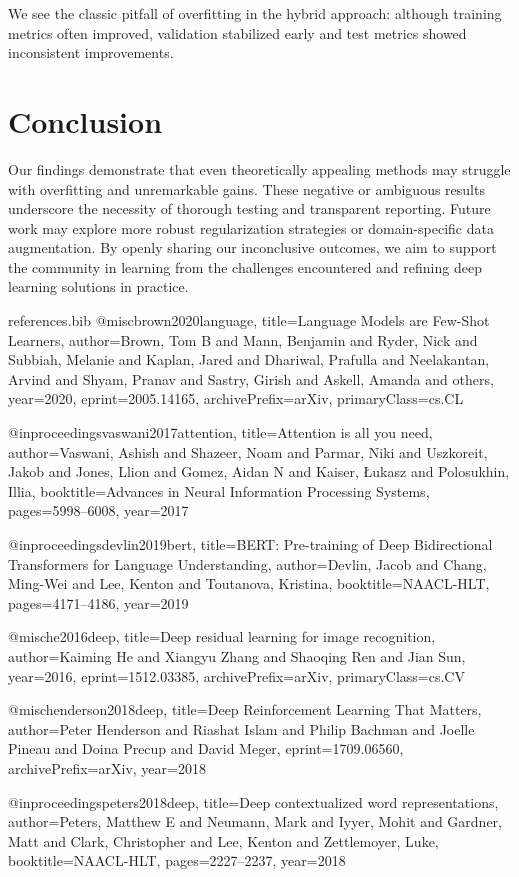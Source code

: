 \documentclass{article}
\begin{document}
We see the classic pitfall of overfitting in the hybrid approach: although training metrics often improved, validation stabilized early and test metrics showed inconsistent improvements.

\section{Conclusion}
Our findings demonstrate that even theoretically appealing methods may struggle with overfitting and unremarkable gains. These negative or ambiguous results underscore the necessity of thorough testing and transparent reporting. Future work may explore more robust regularization strategies or domain-specific data augmentation. By openly sharing our inconclusive outcomes, we aim to support the community in learning from the challenges encountered and refining deep learning solutions in practice.


\begin{filecontents}{references.bib}
@misc{brown2020language,
  title={Language Models are Few-Shot Learners},
  author={Brown, Tom B and Mann, Benjamin and Ryder, Nick and Subbiah, Melanie and Kaplan, Jared and Dhariwal, Prafulla and Neelakantan, Arvind and Shyam, Pranav and Sastry, Girish and Askell, Amanda and others},
  year={2020},
  eprint={2005.14165},
  archivePrefix={arXiv},
  primaryClass={cs.CL}
}

@inproceedings{vaswani2017attention,
  title={Attention is all you need},
  author={Vaswani, Ashish and Shazeer, Noam and Parmar, Niki and Uszkoreit, Jakob and Jones, Llion and Gomez, Aidan N and Kaiser, {\L}ukasz and Polosukhin, Illia},
  booktitle={Advances in Neural Information Processing Systems},
  pages={5998--6008},
  year={2017}
}

@inproceedings{devlin2019bert,
  title={BERT: Pre-training of Deep Bidirectional Transformers for Language Understanding},
  author={Devlin, Jacob and Chang, Ming-Wei and Lee, Kenton and Toutanova, Kristina},
  booktitle={NAACL-HLT},
  pages={4171--4186},
  year={2019}
}

@misc{he2016deep,
  title={Deep residual learning for image recognition},
  author={Kaiming He and Xiangyu Zhang and Shaoqing Ren and Jian Sun},
  year={2016},
  eprint={1512.03385},
  archivePrefix={arXiv},
  primaryClass={cs.CV}
}

@misc{henderson2018deep,
  title={Deep Reinforcement Learning That Matters},
  author={Peter Henderson and Riashat Islam and Philip Bachman and Joelle Pineau and Doina Precup and David Meger},
  eprint={1709.06560},
  archivePrefix={arXiv},
  year={2018}
}

@inproceedings{peters2018deep,
  title={Deep contextualized word representations},
  author={Peters, Matthew E and Neumann, Mark and Iyyer, Mohit and Gardner, Matt and Clark, Christopher and Lee, Kenton and Zettlemoyer, Luke},
  booktitle={NAACL-HLT},
  pages={2227--2237},
  year={2018}
}
\end{filecontents}
\end{document}

